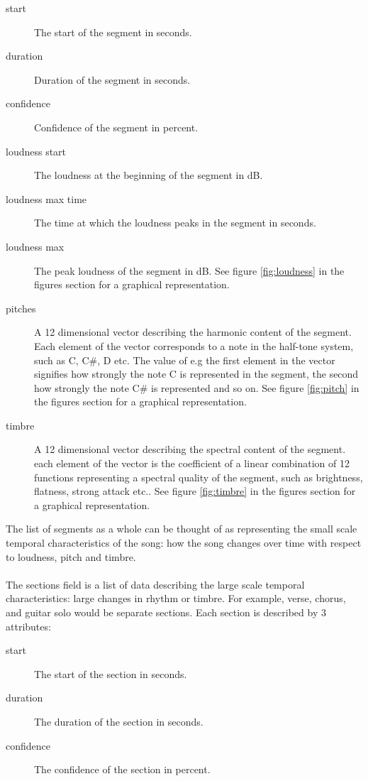 \begin{description}
	\item[start] The start of the segment in seconds.
	\item[duration] Duration of the segment in seconds.
	\item[confidence] Confidence of the segment in percent.
	\item[loudness start] The loudness at the beginning of the segment in dB.
	\item[loudness max time] The time at which the loudness peaks in the segment in seconds.
	\item[loudness max] The peak loudness of the segment in dB. See figure \ref{fig:loudness} in the figures section for a graphical representation.
	\item[pitches] A 12 dimensional vector describing the harmonic content of the segment. Each element of the vector corresponds to a note in the half-tone system, such as C, C\#, D etc. The value of e.g the first element in the vector signifies how strongly the note C is represented in the segment, the second how strongly the note C\# is represented and so on. See figure \ref{fig:pitch} in the figures section for a graphical representation.
	\item[timbre] A 12 dimensional vector describing the spectral content of the segment. each element of the vector is the coefficient of a linear combination of 12 functions representing a spectral quality of the segment, such as brightness, flatness, strong attack etc.. See figure \ref{fig:timbre} in the figures section for a graphical representation.
\end{description}
\noindent The list of segments as a whole can be thought of as representing the small scale temporal characteristics of the song: how the song changes over time with respect to loudness, pitch and timbre.
\\\\
The sections field is a list of data describing the large scale temporal characteristics: large changes in rhythm or timbre. For example, verse, chorus, and guitar solo would be separate sections. Each section is described by 3 attributes:
\begin{description}
	\item[start] The start of the section in seconds.
	\item[duration] The duration of the section in seconds.
	\item[confidence] The confidence of the section in percent.
\end{description}

